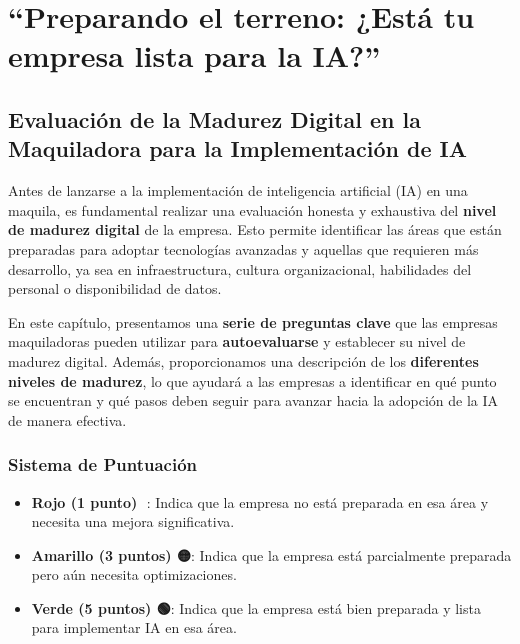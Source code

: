 \documentclass[
  10pt,
  letterpaper,
]{book}
\providecommand{\tightlist}{%
  \setlength{\itemsep}{0pt}\setlength{\parskip}{0pt}}\usepackage{longtable,booktabs,array}
\begin{document}

\chapter{``Preparando el terreno: ¿Está tu empresa lista para la
IA?''}\label{preparando-el-terreno-estuxe1-tu-empresa-lista-para-la-ia}

\section{Evaluación de la Madurez Digital en la Maquiladora para la
Implementación de
IA}\label{evaluaciuxf3n-de-la-madurez-digital-en-la-maquiladora-para-la-implementaciuxf3n-de-ia}

Antes de lanzarse a la implementación de inteligencia artificial (IA) en
una maquila, es fundamental realizar una evaluación honesta y exhaustiva
del \textbf{nivel de madurez digital} de la empresa. Esto permite
identificar las áreas que están preparadas para adoptar tecnologías
avanzadas y aquellas que requieren más desarrollo, ya sea en
infraestructura, cultura organizacional, habilidades del personal o
disponibilidad de datos.

En este capítulo, presentamos una \textbf{serie de preguntas clave} que
las empresas maquiladoras pueden utilizar para \textbf{autoevaluarse} y
establecer su nivel de madurez digital. Además, proporcionamos una
descripción de los \textbf{diferentes niveles de madurez}, lo que
ayudará a las empresas a identificar en qué punto se encuentran y qué
pasos deben seguir para avanzar hacia la adopción de la IA de manera
efectiva.

\subsection{Sistema de Puntuación}\label{sistema-de-puntuaciuxf3n}

\begin{itemize}
\tightlist
\item
  \textbf{Rojo (1 punto) 🔴}: Indica que la empresa no está preparada en
  esa área y necesita una mejora significativa.
\item
  \textbf{Amarillo (3 puntos) 🟡}: Indica que la empresa está
  parcialmente preparada pero aún necesita optimizaciones.
\item
  \textbf{Verde (5 puntos) 🟢}: Indica que la empresa está bien
  preparada y lista para implementar IA en esa área.
\end{itemize}
\end{document}
